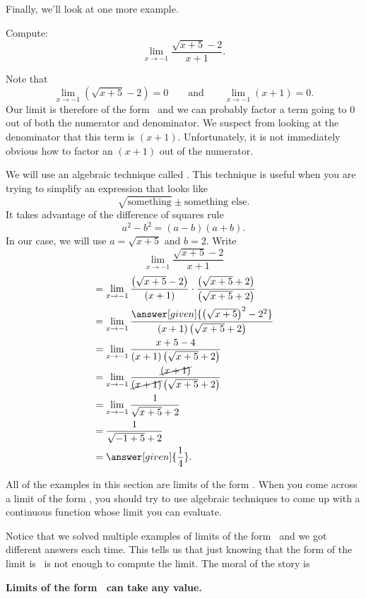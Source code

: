 \documentclass{ximera}
\begin{document}
Finally, we'll look at one more example.

\begin{example}
  Compute:
  \[
  \lim_{x\to-1} \frac{\sqrt{x+5}-2}{x+1}.
  \]

\begin{explanation} 
  Note that 
  \[
  \lim_{x\to-1} \left(\sqrt{x+5}-2\right)=0\qquad\text{and}\qquad\lim_{x\to -1} \left(x+1\right) =0.
  \]
  Our limit is therefore of the form \zeroOverZero\ and we
  can probably factor a term going to $0$ out of both the numerator
  and denominator.  We suspect from looking at the denominator that
  this term is $(x+1)$.  Unfortunately, it is not immediately obvious
  how to factor an $(x+1)$ out of the numerator.
 
  We will use an algebraic technique called .  This technique is useful when you are trying to
  simplify an expression that looks like
  \[
  \sqrt{\text{something}} \pm \text{something else}.
  \]
  It takes advantage of the difference of squares rule 
  \[
  a^2-b^2=(a-b)(a+b).
  \]
  In our case, we will use $a=\sqrt{x+5}$ and $b=2$.  Write
  \[
  \lim_{x\to-1} \frac{\sqrt{x+5}-2}{x+1}
  \]
  \begin{align*}
    &= \lim_{x\to-1} \frac{\left(\sqrt{x+5}-2\right)}{(x+1)} \cdot \frac{\left(\sqrt{x+5}+2\right)}{\left(\sqrt{x+5}+2\right)} \\
&=\lim_{x\to-1} \frac{\answer[given]{\left(\sqrt{x+5}\right)^2-2^2}}{(x+1)\left(\sqrt{x+5}+2\right)} \\
&=\lim_{x\to-1} \frac{x+5-4}{(x+1)\left(\sqrt{x+5}+2\right)} \\
&=\lim_{x\to-1} \frac{\cancel{(x+1)}}{\cancel{(x+1)}\left(\sqrt{x+5}+2\right)} \\
&=\lim_{x\to-1} \frac{1}{\sqrt{x+5}+2}\\
&= \frac{1}{\sqrt{-1+5}+2}\\
&=\answer[given]{\frac{1}{4}}.
\end{align*}
\end{explanation}
\end{example}

All of the examples in this section are limits of the form \zeroOverZero.
When you come across a limit of the form \zeroOverZero, you should try
to use algebraic techniques to come up with a continuous
function whose limit you can evaluate.

Notice that we solved multiple examples of limits of the form
\zeroOverZero\ and we got different answers each time.  This tells us
that just knowing that the form of the limit is \zeroOverZero\ is not enough
to compute the limit. The moral of the story is
\begin{center}
  \textbf{Limits of the form \zeroOverZero\ can take any value.}
\end{center}
\end{document}
